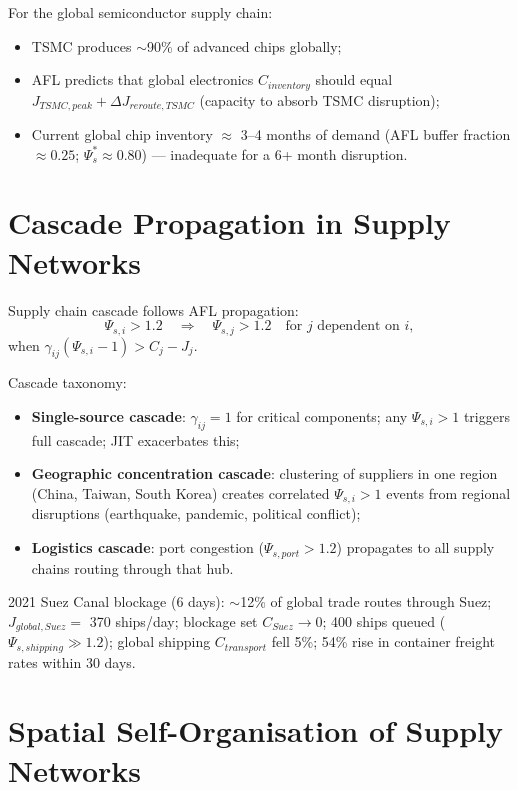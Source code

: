 \documentclass[11pt]{article}
\begin{document}
For the global semiconductor supply chain:
\begin{itemize}
    \item TSMC produces $\sim$90\% of advanced chips globally;
    \item AFL predicts that global electronics $C_{inventory}$ should equal $J_{TSMC,peak} +
          \Delta J_{reroute,TSMC}$ (capacity to absorb TSMC disruption);
    \item Current global chip inventory $\approx$ 3--4 months of demand (AFL buffer fraction
          $\approx 0.25$; $\Psi_s^* \approx 0.80$) --- inadequate for a 6+ month disruption.
\end{itemize}

\section{Cascade Propagation in Supply Networks}

Supply chain cascade follows AFL propagation:
\begin{equation}
\Psi_{s,i} > 1.2 \quad \Rightarrow \quad \Psi_{s,j} > 1.2 \quad \text{for } j \text{ dependent on } i,
\end{equation}
when $\gamma_{ij}(\Psi_{s,i} - 1) > C_j - J_j$.

Cascade taxonomy:
\begin{itemize}
    \item \textbf{Single-source cascade}: $\gamma_{ij} = 1$ for critical components; any $\Psi_{s,i}
          > 1$ triggers full cascade; JIT exacerbates this;
    \item \textbf{Geographic concentration cascade}: clustering of suppliers in one region
          (China, Taiwan, South Korea) creates correlated $\Psi_{s,i} > 1$ events from regional
          disruptions (earthquake, pandemic, political conflict);
    \item \textbf{Logistics cascade}: port congestion ($\Psi_{s,port} > 1.2$) propagates to all
          supply chains routing through that hub.
\end{itemize}

2021 Suez Canal blockage (6 days): $\sim$12\% of global trade routes through Suez; $J_{global,Suez}
= $ 370 ships/day; blockage set $C_{Suez} \to 0$; 400 ships queued ($\Psi_{s,shipping} \gg 1.2$);
global shipping $C_{transport}$ fell 5\%; 54\% rise in container freight rates within 30 days.

\section{Spatial Self-Organisation of Supply Networks}
\end{document}
